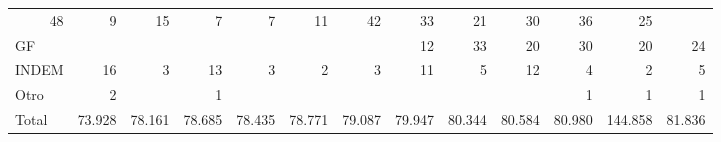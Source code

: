 \begin{tabular}{lllllllllllll}
  \multicolumn{1}{|r}{48} &
  \multicolumn{1}{r}{9} &
  \multicolumn{1}{r}{15} &
  \multicolumn{1}{r}{7} &
  \multicolumn{1}{r}{7} &
  \multicolumn{1}{r}{11} &
  \multicolumn{1}{r}{42} &
  \multicolumn{1}{r}{33} &
  \multicolumn{1}{r}{21} &
  \multicolumn{1}{r}{30} &
  \multicolumn{1}{r}{36} &
  \multicolumn{1}{r}{25} \\
\multicolumn{1}{l}{\hspace{1em}GF} &
  \multicolumn{1}{|r}{} &
  \multicolumn{1}{r}{} &
  \multicolumn{1}{r}{} &
  \multicolumn{1}{r}{} &
  \multicolumn{1}{r}{} &
  \multicolumn{1}{r}{} &
  \multicolumn{1}{r}{12} &
  \multicolumn{1}{r}{33} &
  \multicolumn{1}{r}{20} &
  \multicolumn{1}{r}{30} &
  \multicolumn{1}{r}{20} &
  \multicolumn{1}{r}{24} \\
\multicolumn{1}{l}{\hspace{1em}INDEM} &
  \multicolumn{1}{|r}{16} &
  \multicolumn{1}{r}{3} &
  \multicolumn{1}{r}{13} &
  \multicolumn{1}{r}{3} &
  \multicolumn{1}{r}{2} &
  \multicolumn{1}{r}{3} &
  \multicolumn{1}{r}{11} &
  \multicolumn{1}{r}{5} &
  \multicolumn{1}{r}{12} &
  \multicolumn{1}{r}{4} &
  \multicolumn{1}{r}{2} &
  \multicolumn{1}{r}{5} \\
\multicolumn{1}{l}{\hspace{1em}Otro} &
  \multicolumn{1}{|r}{2} &
  \multicolumn{1}{r}{} &
  \multicolumn{1}{r}{1} &
  \multicolumn{1}{r}{} &
  \multicolumn{1}{r}{} &
  \multicolumn{1}{r}{} &
  \multicolumn{1}{r}{} &
  \multicolumn{1}{r}{} &
  \multicolumn{1}{r}{} &
  \multicolumn{1}{r}{1} &
  \multicolumn{1}{r}{1} &
  \multicolumn{1}{r}{1} \\
\multicolumn{1}{l}{\hspace{1em}Total} &
  \multicolumn{1}{|r}{73.928} &
  \multicolumn{1}{r}{78.161} &
  \multicolumn{1}{r}{78.685} &
  \multicolumn{1}{r}{78.435} &
  \multicolumn{1}{r}{78.771} &
  \multicolumn{1}{r}{79.087} &
  \multicolumn{1}{r}{79.947} &
  \multicolumn{1}{r}{80.344} &
  \multicolumn{1}{r}{80.584} &
  \multicolumn{1}{r}{80.980} &
  \multicolumn{1}{r}{144.858} &
  \multicolumn{1}{r}{81.836} \\
\cline{1-13}
\end{tabular}
